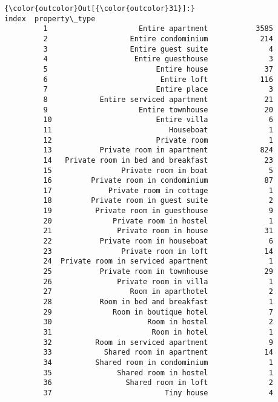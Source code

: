 \documentclass[11pt]{article}
\begin{document}
\begin{Verbatim}[commandchars=\\\{\}]
{\color{outcolor}Out[{\color{outcolor}31}]:}                                  index  property\_type
         1                     Entire apartment           3585
         2                   Entire condominium            214
         3                   Entire guest suite              4
         4                    Entire guesthouse              3
         5                         Entire house             37
         6                          Entire loft            116
         7                         Entire place              3
         8            Entire serviced apartment             21
         9                     Entire townhouse             20
         10                        Entire villa              6
         11                           Houseboat              1
         12                        Private room              1
         13           Private room in apartment            824
         14   Private room in bed and breakfast             23
         15                Private room in boat              5
         16         Private room in condominium             87
         17             Private room in cottage              1
         18         Private room in guest suite              2
         19          Private room in guesthouse              9
         20              Private room in hostel              1
         21               Private room in house             31
         22           Private room in houseboat              6
         23                Private room in loft             14
         24  Private room in serviced apartment              1
         25           Private room in townhouse             29
         26               Private room in villa              1
         27                  Room in aparthotel              2
         28           Room in bed and breakfast              1
         29              Room in boutique hotel              7
         30                      Room in hostel              2
         31                       Room in hotel              1
         32          Room in serviced apartment              9
         33            Shared room in apartment             14
         34          Shared room in condominium              1
         35               Shared room in hostel              1
         36                 Shared room in loft              2
         37                          Tiny house              4
\end{Verbatim}
            
\end{document}
